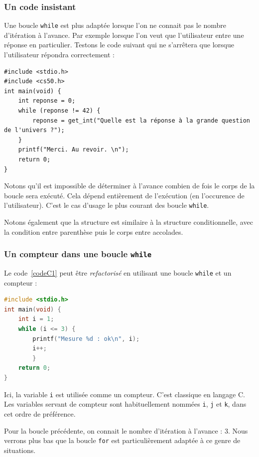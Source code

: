 \subsubsection{Un code insistant}
Une boucle \texttt{while} est plus adaptée lorsque l'on ne connait pas le nombre d'itération à l'avance. Par exemple lorsque l'on veut que l'utilisateur entre une réponse en particulier.  Testons le code suivant qui ne s'arrêtera que lorsque l'utilisateur répondra correctement :
\begin{lstlisting}[caption={Exemple de boucle while : 42!}]
#include <stdio.h>
#include <cs50.h>
int main(void) {
    int reponse = 0;
    while (reponse != 42) {
        reponse = get_int("Quelle est la réponse à la grande question de l'univers ?");
    }
    printf("Merci. Au revoir. \n");
    return 0;
}
\end{lstlisting}

Notons qu'il est impossible de déterminer à l'avance combien de fois le corps de la boucle sera exécuté. Cela dépend entièrement de l'exécution (en l'occurence de l'utilisateur). C'est le cas d'usage le plus courant des boucle \texttt{while}.

Notons également que la structure est similaire à la structure conditionnelle, avec la condition entre parenthèse puis le corps entre accolades.

\subsubsection{Un compteur dans une boucle \texttt{while}}
Le code~\ref{codeC1} peut être \textit{refactorisé} en utilisant une boucle \texttt{while} et un compteur :
\begin{lstlisting}[language=c,label=mesures-while,caption={Affichage de mesures avec \texttt{while}}]
#include <stdio.h>
int main(void) {
    int i = 1;
    while (i <= 3) {
        printf("Mesure %d : ok\n", i);
        i++;
        }
    return 0;
}
\end{lstlisting}

Ici, la variable \texttt{i} est utilisée comme un compteur. C'est classique en langage C. Les variables servant de compteur sont habituellement nommées \texttt{i}, \texttt{j} et \texttt{k}, dans cet ordre de préférence.

Pour la boucle précédente, on connait le nombre d'itération à l'avance : 3. Nous verrons plus bas que la boucle \texttt{for} est particulièrement adaptée à ce genre de situations.

\TrouConditionArret

